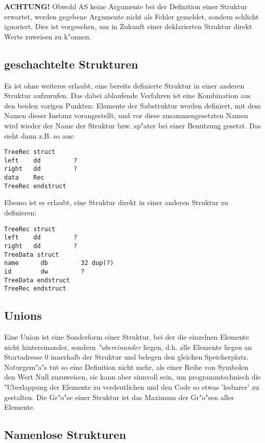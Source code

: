 \documentclass[12pt,a4paper,twoside]{report}
\begin{document}
{\bf ACHTUNG!} Obwohl AS keine Argumente bei der Definition einer Struktur
erwartet, werden gegebene Argumente nicht als Fehler gemeldet, sondern
schlicht ignoriert.  Dies ist vorgesehen, um in Zukunft einer deklarierten
Struktur direkt Werte zuweisen zu k"onnen.

\subsection{geschachtelte Strukturen}

Es ist ohne weiteres erlaubt, eine bereits definierte Struktur in einer
anderen Struktur aufzurufen.  Das dabei ablaufende Verfahren ist eine
Kombination aus den beiden vorigen Punkten: Elemente der Substruktur
werden definiert, mit dem Namen dieser Instanz vorangestellt, und vor
diese zusammengesetzten Namen wird wieder der Name der Struktur bzw.
sp"ater bei einer Benutzung gesetzt.  Das sieht dann z.B. so aus:
\begin{verbatim}
TreeRec struct
left    dd         ?
right   dd         ?
data    Rec
TreeRec endstruct
\end{verbatim}

Ebenso ist es erlaubt, eine Struktur direkt in einer anderen
Struktur zu definieren:
\begin{verbatim}
TreeRec struct
left    dd         ?
right   dd         ?
TreeData struct
name      db         32 dup(?)
id        dw         ?
TreeData endstruct
TreeRec endstruct
\end{verbatim}


\subsection{Unions}

Eine Union ist eine Sonderform einer Struktur, bei der die einzelnen
Elemente nicht hintereinander, sondern {\em "ubereinander} liegen, d.h.
alle Elemente liegen an Startadresse 0 innerhalb der Struktur und belegen
den gleichen Speicherplatz.  Naturgem"a"s tut so eine Definition nicht
mehr, als einer Reihe von Symbolen den Wert Null zuzuweisen, sie kann aber
sinnvoll sein, um programmtechnisch die "Uberlappung der Elemente zu
verdeutlichen und den Code so etwas 'lesbarer' zu gestalten.  Die Gr"o"se
einer Struktur ist das Maximum der Gr"o"sen aller Elemente.

\subsection{Namenlose Strukturen}
\end{document}
